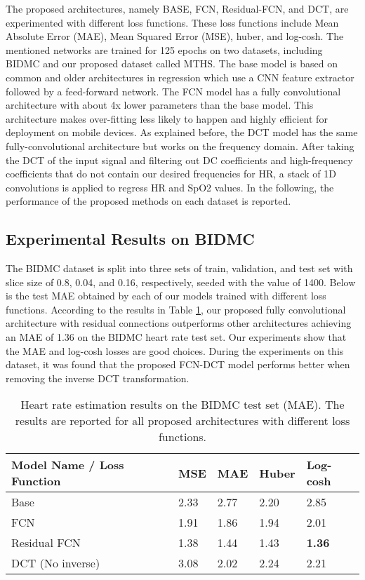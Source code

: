 \documentclass[conference]{IEEEtran}
\begin{document}
The proposed architectures, namely BASE, FCN, Residual-FCN, and DCT, are experimented with different loss functions. These loss functions include Mean Absolute Error (MAE), Mean Squared Error (MSE), huber, and log-cosh. The mentioned networks are trained for 125 epochs on two datasets, including BIDMC \cite{b15} and our proposed dataset called MTHS. The base model is based on common and older architectures in regression which use a CNN feature extractor followed by a feed-forward network. The FCN model has a fully convolutional architecture with about 4x lower parameters than the base model. This architecture makes over-fitting less likely to happen and highly efficient for deployment on mobile devices. As explained before, the DCT model has the same fully-convolutional architecture but works on the frequency domain. After taking the DCT of the input signal and filtering out DC coefficients and high-frequency coefficients that do not contain our desired frequencies for HR, a stack of 1D convolutions is applied to regress HR and SpO2 values. In the following, the performance of the proposed methods on each dataset is reported.

\subsection{Experimental Results on BIDMC}
The BIDMC dataset is split into three sets of train, validation, and test set with slice size of 0.8, 0.04, and 0.16, respectively, seeded with the value of 1400. Below is the test MAE obtained by each of our models trained with different loss functions. According to the results in Table \ref{table:BIDMC-MAE-hr}, our proposed fully convolutional architecture with residual connections outperforms other architectures achieving an MAE of 1.36 on the BIDMC heart rate test set. Our experiments show that the MAE and log-cosh losses are good choices. During the experiments on this dataset, it was found that the proposed FCN-DCT model performs better when removing the inverse DCT transformation.


\begin{table}[h]
\caption{Heart rate estimation results on the BIDMC test set (MAE). The results are reported for all proposed architectures with different loss functions.}
\label{table:BIDMC-MAE-hr}
\begin{tabular}{lllll}
\toprule
Model Name / Loss Function & MSE  & MAE  & Huber & Log-cosh \\ \hline
Base                     & 2.33 & 2.77  & 2.20  & 2.85     \\
FCN                      & 1.91 & 1.86  & 1.94  & 2.01     \\
Residual FCN            & 1.38 & 1.44 & 1.43 & \textbf{1.36}     \\
DCT (No inverse)        & 3.08 & 2.02 & 2.24  & 2.21    \\
\bottomrule
\end{tabular}
\end{table}
\end{document}
